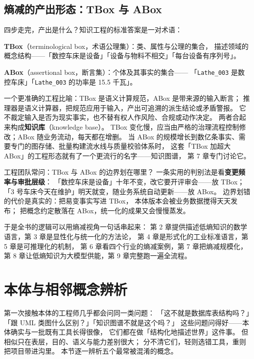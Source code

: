 \subsection{熵减的产出形态：TBox 与 ABox}

四步走完，产出是什么？知识工程的标准答案是一对术语：

\begin{noteblock}
\textbf{TBox}（terminological box，术语公理集）：类、属性与公理的集合，
描述领域的概念结构——「数控车床是设备」「设备与物料不相交」「每台设备有序列号」。

\textbf{ABox}（assertional box，断言集）：个体及其事实的集合——
「\texttt{Lathe\_003} 是数控车床」「\texttt{Lathe\_003} 的功率是 15.5 千瓦」。
\end{noteblock}

一个更准确的工程比喻：TBox 是语义计算规范，ABox 是带来源的输入断言；
推理器是语义计算器，把规范应用于输入，产出可追溯的派生结论或矛盾警报。
它不裁定输入是否为现实事实，也不替有权人作风险、合规或动作决定。
两者合起来构成\textbf{知识库}（knowledge base）。
TBox 变化慢，应当由严格的治理流程控制修改；ABox 随业务流动，每天都在增删。
当 ABox 的规模增长到数亿条事实、需要专门的图存储、批量构建流水线与质量校验体系时，
这套「TBox 加超大 ABox」的工程形态就有了一个更流行的名字——知识图谱，
第 7 章专门讨论它。

工程团队常问：TBox 与 ABox 的边界划在哪里？
一条实用的判别法是看\textbf{变更频率与审批层级}：
「数控车床是设备」十年不变，改它要开评审会——放 TBox；
「3 号车床今天在维护」明天就变，随业务系统自动更新——放 ABox。
边界划错的代价是真实的：把易变事实写进 TBox，
本体版本会被业务数据搅得天天发布；
把概念约定散落在 ABox，统一化的成果又会慢慢蒸发。

于是全书的逻辑可以用熵减视角一句话串起来：
第 2 章提供描述低熵知识的数学语言，第 3 章是显性化与统一化的方法论，
第 4 章是形式化的工业标准语言，第 5 章是可推理化的机制，
第 6 章看四个行业的熵减案例，第 7 章把熵减规模化，
第 8 章让低熵知识为大模型供能，第 9 章完整跑一遍全流程。

\section{本体与相邻概念辨析}

第一次接触本体的工程师几乎都会问同一类问题：
「这不就是数据库表结构吗？」「跟 UML 类图什么区别？」「知识图谱不就是这个吗？」
这些问题问得好——本体确实与一批既有工具长得很像，
它们都在做「结构化地描述世界」这件事。
但相似只在表层，目的、语义与能力差别很大；
分不清它们，轻则选错工具，重则把项目带进沟里。
本节逐一辨析五个最常被混淆的概念。

